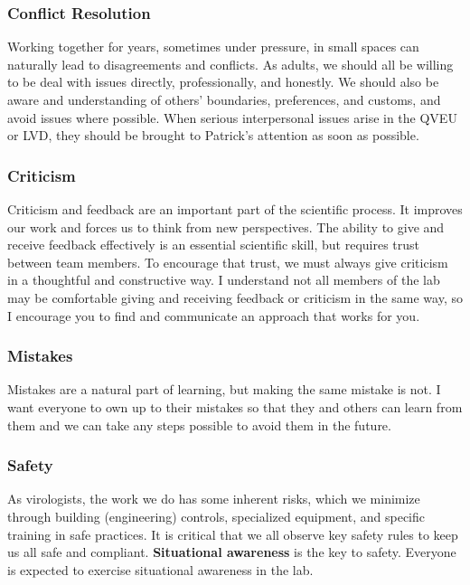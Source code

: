 \documentclass[10pt, letterpaper, twocolumn]{article} %
\begin{document}
\subsubsection{Conflict Resolution}
Working together for years, sometimes under pressure, in small spaces can naturally lead to disagreements and conflicts. As adults, we should all be willing to be deal with issues directly, professionally, and honestly. We should also be aware and understanding of others' boundaries, preferences, and customs, and avoid issues where possible. When serious interpersonal issues arise in the QVEU or LVD, they should be brought to Patrick's attention as soon as possible.

\subsubsection{Criticism}
Criticism and feedback are an important part of the scientific process. It improves our work and forces us to think from new perspectives. The ability to give and receive feedback effectively is an essential scientific skill, but requires trust between team members. To encourage that trust, we must always give criticism in a thoughtful and constructive way. I understand not all members of the lab may be comfortable giving and receiving feedback or criticism in the same way, so I encourage you to find and communicate an approach that works for you.

\subsubsection{Mistakes}
Mistakes are a natural part of learning, but making the same mistake is not. I want everyone to own up to their mistakes so that they and others can learn from them and we can take any steps possible to avoid them in the future.

\subsubsection{Safety}
As virologists, the work we do has some inherent risks, which we minimize through building (engineering) controls, specialized equipment, and specific training in safe practices. It is critical that we all observe key safety rules to keep us all safe and compliant.\newline \newline
{\bfseries Situational awareness} is the key to safety. Everyone is expected to exercise situational awareness in the lab.
\end{document}
